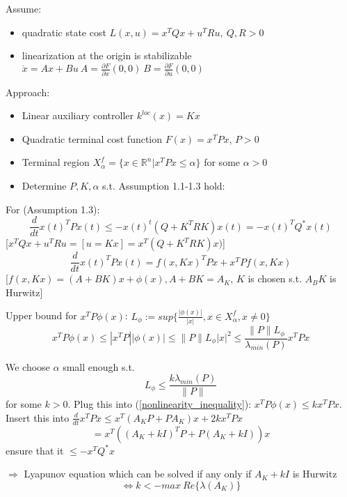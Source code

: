 Assume:
\begin{itemize}
\item quadratic state cost $L(x,u) = x^TQx + u^TRu, \ Q,R >0$
\item linearization at the origin is stabilizable 
$\dot x = Ax+Bu \ A = \frac{\partial F}{\partial x}(0,0) \ B = \frac{\partial F}{\partial u}(0,0)$
\end{itemize} 

Approach: 
\begin{itemize}
\item Linear auxiliary controller $k^{loc}(x)=Kx$
\item Quadratic terminal cost function $F(x) = x^TPx$, $P > 0$
\item Terminal region $X_{\alpha}^f = \{x \in \mathbb{R}^n | x^TPx \leq \alpha\}$ for some $\alpha > 0$
\item Determine $P,K,\alpha$ s.t. Assumption 1.1-1.3 hold:
\end{itemize}
For (Assumption 1.3):
\begin{equation*}
\frac{d}{dt}x(t)^TPx(t) \leq - x(t)^t(Q + K^TRK)x(t) = - x(t)^TQ^*x(t)
\end{equation*}
[$x^TQx + u^TRu = [u=Kx] = x^T(Q+K^TRK)x)$]
\begin{equation*}
\frac{d}{dt}x(t)^TPx(t) = f(x,Kx)^TPx + x^TPf(x,Kx)
\end{equation*}
[$f(x,Kx) = (A+BK)x+\phi(x), A+BK = A_K$, $K$ is chosen s.t. $A_BK$ is Hurwitz]

Upper bound for $x^TP\phi(x)$:
$L_{\phi} := sup\{ \frac{|\phi(x)|}{|x|}, x \in X_{\alpha}^{f}, x \neq 0\}$
\begin{equation}\label{nonlinearity_inequality}
x^TP\phi(x) \leq |x^TP| |\phi(x)| \leq \| P\| L_{\phi} |x|^2 \leq \frac{\|P\|L_{\phi}}{\lambda_{min}(P)}x^TPx
\end{equation}

We choose $\alpha$ small enough s.t. 
\begin{equation}\label{alpha_choice}
L_{\phi} \leq \frac{k \lambda_{min}(P)}{\|P\|} 
\end{equation}
for some $k > 0$. Plug this into (\ref{nonlinearity_inequality}): $x^TP\phi(x) \leq kx^TPx$. Insert this into $\frac{d}{dt}x^TPx \leq x^T(A_KP + PA_K)x + 2kx^TPx$
\begin{equation*}
= x^T((A_K + kI)^TP + P(A_K+kI))x
\end{equation*}
ensure that it $\leq - x^TQ^*x$

$\Rightarrow$ Lyapunov equation which can be solved if any only if $A_K + kI$ is Hurwitz 
\begin{equation}\label{k_choice_inequality}
\Leftrightarrow k < - max\ Re \{ \lambda(A_K)\}
\end{equation}

